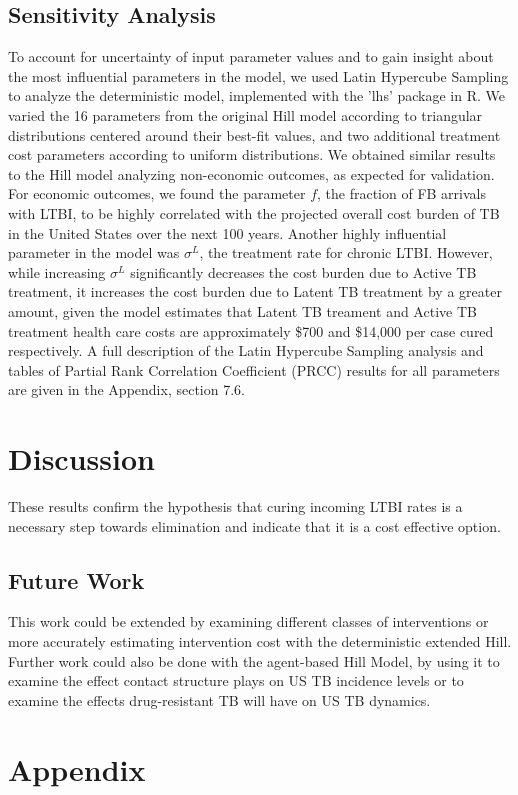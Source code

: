 \documentclass{amsart}
\begin{document}
\subsection{Sensitivity Analysis}
To account for uncertainty of input parameter values and to gain insight about the
most influential parameters in the model, we used Latin Hypercube Sampling to 
analyze the deterministic model, implemented with the 'lhs' package in R.  We varied 
the 16 parameters from the original Hill model according to triangular distributions centered
around their best-fit values, and two additional treatment cost parameters according to uniform distributions.  We obtained similar results to the Hill model 
analyzing non-economic outcomes, as expected for validation.  For economic 
outcomes, we found the parameter $f$, the fraction of FB arrivals with LTBI,
to be highly correlated with the projected overall cost burden of TB in the United States
over the next 100 years.  Another highly influential parameter in the model was $\sigma^{L}$, 
the treatment rate for chronic LTBI.  However, while increasing $\sigma^{L}$ significantly
decreases the cost burden due to Active TB treatment, it increases the cost burden due to Latent TB treatment by a greater amount, given the model estimates that Latent TB treament and Active
TB treatment health care costs are approximately \$700 and \$14,000 per case cured respectively.  
A full description of the Latin Hypercube Sampling analysis and tables of Partial Rank Correlation Coefficient (PRCC) results for all parameters are given in the Appendix, section 7.6.  \\


\section{Discussion}
These results confirm the hypothesis that curing incoming LTBI rates is a
necessary step towards elimination and indicate that it is a cost effective
option. 
\subsection{Future Work}
This work could be extended by examining different classes of interventions or
more accurately estimating intervention cost with the deterministic extended
Hill. Further work could also be done with the agent-based Hill Model, by using
it to examine the effect contact structure plays on US TB incidence levels or to
examine the effects drug-resistant TB will have on US TB dynamics. 
\section{Appendix}
\end{document}
